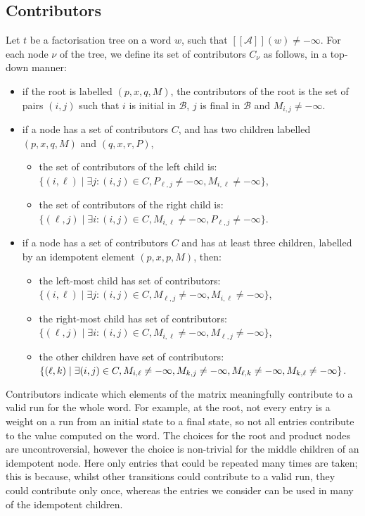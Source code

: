 \documentclass[10pt,a4paper]{amsart}
\theoremstyle{definition}
\numberwithin{equation}{section}
\theoremstyle{remark}
\newcommand{\autA}{\mathcal{A}}
\newcommand{\autB}{\mathcal{B}}
\newcommand{\brfunc}[1]{[\![#1]\!]}
\newcommand{\funcA}{\brfunc{\autA}}
\theoremstyle{remark}
\begin{document}
\subsection{Contributors}

Let $t$ be a factorisation tree on a word $w$, such that $\funcA(w) \neq -\infty$. For each node $\nu$ of the tree, we define its set of contributors $C_{\nu}$ as follows, in a top-down manner:
\begin{itemize}
\item if the root is labelled $(p,x,q,M)$, the contributors of the root is the set of pairs $(i,j)$ such that $i$ is initial in $\autB$, $j$ is final in $\autB$ and $M_{i,j} \neq - \infty$.
\item if a node has a set of contributors $C$, and has two children labelled $(p,x,q,M)$ and $(q,x,r,P)$,
\begin{itemize}
\item  the set of contributors of the left child is: \\
$\{(i,\ell)\mid \exists j : (i,j) \in C, P_{\ell,j} \neq -\infty, M_{i,\ell}\ne-\infty\}$,
\item  the set of contributors of the right child is:\\
$\{(\ell,j)\mid \exists i : (i,j) \in C, M_{i,\ell} \neq -\infty, P_{\ell,j}\ne-\infty\}$.
\end{itemize}
\item if a node has a set of contributors $C$ and has at least three children, labelled by an idempotent element $(p,x,p,M)$, then:
\begin{itemize}
\item the left-most child has set of contributors:\\ $\{(i,\ell)\mid\exists j: (i,j) \in C, M_{\ell,j} \neq -\infty , M_{i,\ell}\ne-\infty\}$,
\item the right-most child has set of contributors:\\ $\{(\ell,j)\mid \exists i : (i,j) \in C, M_{i,\ell} \neq -\infty, M_{\ell,j}\ne-\infty\}$,
\item the other children have set of contributors:\\
 $\{(\ell,k)\mid  \exists (i,j) \in C, M_{i,\ell} \neq -\infty, M_{k,j} \neq -\infty, \\ M_{\ell,k}\ne-\infty,M_{k,\ell}\ne-\infty\}$. 
\end{itemize}
\end{itemize}

Contributors indicate which elements of the matrix meaningfully contribute to a valid run for the whole word. For example, at the root, not every entry is a weight on a run from an initial state to a final state, so not all entries contribute to the value computed on the word. The choices for the root and product nodes are uncontroversial, however the choice is non-trivial for the middle children of an idempotent node. Here only entries that could be repeated many times are taken; this is because, whilst other transitions could contribute to a valid run, they could contribute only once, whereas the entries we consider can be used in many of the idempotent children.  
\end{document}
